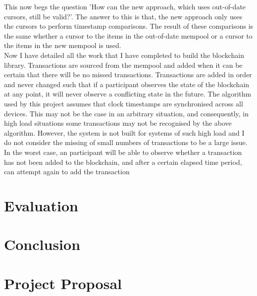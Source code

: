 \documentclass[12pt,a4paper,twoside,openright]{report}
\begin{document}
		This now begs the question 'How can the new approach, which uses out-of-date cursors, still be valid?'.
		The answer to this is that, the new approach only uses the cursors to perform timestamp comparisons.
		The result of these comparisons is the same whether a cursor to the items in the out-of-date mempool or a cursor to the items in the new mempool is used.\\

		Now I have detailed all the work that I have completed to build the blockchain library.
		Transactions are sourced from the mempool and added when it can be certain that there will be no missed transactions.
		Transactions are added in order and never changed such that if a participant observes the state of the blockchain at any point, it will never observe a conflicting state in the future.
		The algorithm used by this project assumes that clock timestamps are synchronised across all devices.
		This may not be the case in an arbitrary situation, and consequently, in high load situations some transactions may not be recognised by the above algorithm. 
		However, the system is not built for systems of such high load and I do not consider the missing of small numbers of transactions to be a large issue. 
		In the worst case, an participant will be able to observe whether a transaction has not been added to the blockchain, and after a certain elapsed time period, can attempt again to add the transaction

	\chapter{Evaluation}
	
	\chapter{Conclusion}
	
	
	
	
	
	\appendix

	\chapter{Project Proposal}
	
	
	
	
\end{document}
